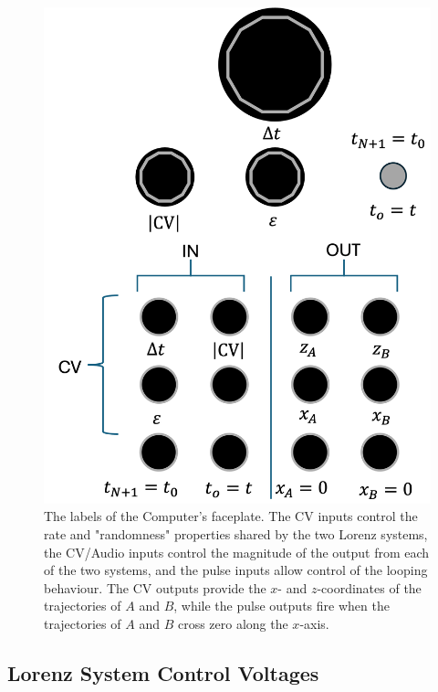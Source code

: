 \documentclass{tufte-handout}
\begin{document}
\begin{figure}[h]
  \includegraphics[width=\linewidth]{module_labels.png}%
  \caption{The labels of the Computer's faceplate. The CV inputs control the rate and "randomness" properties shared by the two Lorenz systems, the CV/Audio inputs control the magnitude of the output from each of the two systems, and the pulse inputs allow control of the looping behaviour. The CV outputs provide the $x$- and $z$-coordinates of the trajectories of $A$ and $B$, while the pulse outputs fire when the trajectories of $A$ and $B$ cross zero along the $x$-axis.}%
  \label{fig:module_labels}%
\end{figure}

\subsection{Lorenz System Control Voltages}
\end{document}
